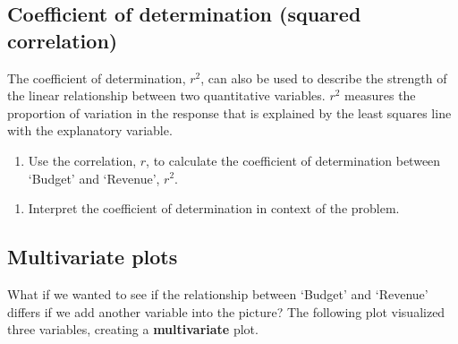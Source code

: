 \documentclass[
]{report}
\providecommand{\tightlist}{%
  \setlength{\itemsep}{0pt}\setlength{\parskip}{0pt}}
\begin{document}
\vspace{.2in}

\newpage

\hypertarget{coefficient-of-determination-squared-correlation}{%
\subsection*{Coefficient of determination (squared correlation)}\label{coefficient-of-determination-squared-correlation}}

The coefficient of determination, \(r^2\), can also be used to describe the strength of the linear relationship between two quantitative variables. \(r^2\) measures the proportion of variation in the response that is explained by the least squares line with the explanatory variable.

\begin{enumerate}
\def\labelenumi{\arabic{enumi}.}
\setcounter{enumi}{14}
\tightlist
\item
  Use the correlation, \(r\), to calculate the coefficient of determination between `Budget' and `Revenue', \(r^2\).
\end{enumerate}

\vspace{.4in}

\begin{enumerate}
\def\labelenumi{\arabic{enumi}.}
\setcounter{enumi}{15}
\tightlist
\item
  Interpret the coefficient of determination in context of the problem.
\end{enumerate}

\vspace{.6in}

\hypertarget{multivariate-plots}{%
\subsection*{Multivariate plots}\label{multivariate-plots}}

What if we wanted to see if the relationship between `Budget' and `Revenue' differs if we add another variable into the picture? The following plot visualized three variables, creating a \textbf{multivariate} plot.
\end{document}
